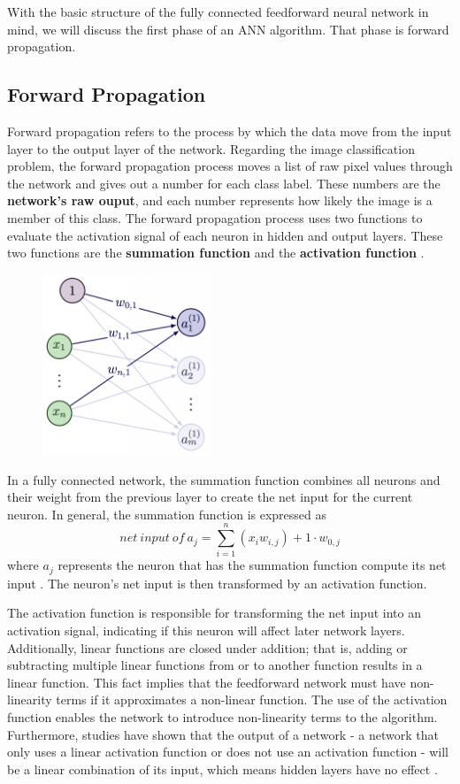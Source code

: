 With the basic structure of the fully connected feedforward neural network in mind, we will discuss the first phase of an ANN algorithm. That phase is forward propagation.

\subsection{Forward Propagation} \label{forwardprop_section}
Forward propagation refers to the process by which the data move from the input layer to the output layer of the network. Regarding the image classification problem, the forward propagation process moves a list of raw pixel values through the network and gives out a number for each class label. These numbers are the \textbf{network's raw ouput}, and each number represents how likely the image is a member of this class. The forward propagation process uses two functions to evaluate the activation signal of each neuron in hidden and output layers. These two functions are the \textbf{summation function} and the \textbf{activation function} \cite{taylor2017neural}.

\begin{figure}
    \centering
    \includegraphics[width=2in]{figures/fp_diagram.png}
\end{figure}

\noindent In a fully connected network, the summation function combines all neurons and their weight from the previous layer to create the net input for the current neuron. In general, the summation function is expressed as \[net\ input\ of\ a_j = \sum_{i=1}^n (x_i w_{i,j}) + 1 \cdot w_{0,j}\] where $a_j$ represents the neuron that has the summation function compute its net input \cite{taylor2017neural}. The neuron's net input is then transformed by an activation function.

The activation function is responsible for transforming the net input into an activation signal, indicating if this neuron will affect later network layers. Additionally, linear functions are closed under addition; that is, adding or subtracting multiple linear functions from or to another function results in a linear function. This fact implies that the feedforward network must have non-linearity terms if it approximates a non-linear function. The use of the activation function enables the network to introduce non-linearity terms to the algorithm. Furthermore, studies have shown that the output of a network - a network that only uses a linear activation function or does not use an activation function - will be a linear combination of its input, which means hidden layers have no effect \cite{He_2015_ICCV}.

